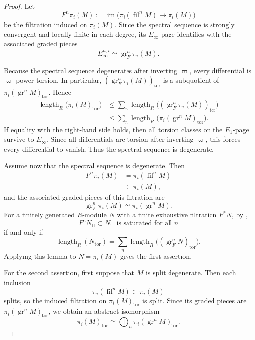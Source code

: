 \documentclass[11pt]{amsart}
\numberwithin{equation}{section}
\newcommand{\tf}{\operatorname{tf}}
\newcommand{\len}{\operatorname{length}}
\newcommand{\tors}{\operatorname{tor}}
\newcommand{\gr}{{\operatorname{gr}}}
\newcommand{\fil}{{\operatorname{fil}}}
\numberwithin{equation}{section}
\begin{document}
\begin{proof}
Let
\begin{equation*}
  F^n\pi_i(M):=
  \operatorname{im}\bigl(\pi_i(\fil^nM)\to \pi_i(M)\bigr)
\end{equation*}
be the filtration induced on $\pi_i(M)$. Since the spectral sequence is
strongly convergent and locally finite in each degree, its $E_\infty$-page
identifies with the associated graded pieces
\begin{equation*}
  E_\infty^{n,i}\simeq \gr_F^n\pi_i(M).
\end{equation*}

Because the spectral sequence degenerates after inverting $\varpi$, every
differential is $\varpi$-power torsion. In particular,
$(\gr_F^n\pi_i(M))_{\tors}$ is a subquotient of
$\pi_i(\gr^nM)_{\tors}$. Hence
\begin{align*}
  \len_R\bigl(\pi_i(M)_{\tors}\bigr)
  &\le
  \sum_n
  \len_R\bigl((\gr_F^n\pi_i(M))_{\tors}\bigr) \\
  &\le
  \sum_n
  \len_R\bigl(\pi_i(\gr^nM)_{\tors}\bigr).
\end{align*}
If equality with the right-hand side holds, then all torsion classes on the
$E_1$-page survive to $E_\infty$. Since all differentials are torsion after
inverting $\varpi$, this forces every differential to vanish. Thus the
spectral sequence is degenerate.

Assume now that the spectral sequence is degenerate. Then
\begin{align*}
  F^n\pi_i(M)
  &=
  \pi_i(\fil^nM) \\
  &\subset
  \pi_i(M),
\end{align*}
and the associated graded pieces of this filtration are
\begin{equation*}
  \gr_F^n\pi_i(M)\simeq \pi_i(\gr^nM).
\end{equation*}
For a finitely generated $R$-module $N$ with a finite exhaustive filtration
$F^* N$, by \cite[Lemma 2.6]{L22}, 
\begin{equation*}
  F^nN_{\tf}\subset N_{\tf}
  \text{ is saturated for all } n
\end{equation*}
if and only if
\begin{equation*}
  \len_R(N_{\tors})
  =
  \sum_n \len_R\bigl((\gr_F^nN)_{\tors}\bigr).
\end{equation*}
Applying this lemma to $N=\pi_i(M)$ gives the first assertion.

For the second assertion, first suppose that $M$ is split degenerate.
Then each inclusion
\begin{equation*}
  \pi_i(\fil^nM)\subset \pi_i(M)
\end{equation*}
splits, so the induced filtration on $\pi_i(M)_{\tors}$ is split. Since
its graded pieces are $\pi_i(\gr^nM)_{\tors}$, we obtain an abstract
isomorphism
\begin{equation*}
  \pi_i(M)_{\tors}
  \simeq
  \bigoplus_n \pi_i(\gr^nM)_{\tors}.
\end{equation*}


\end{proof}
\end{document}
